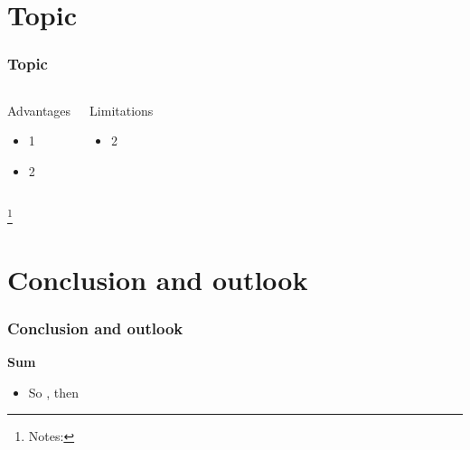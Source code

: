 \documentclass[hyperref={bookmarks=false},aspectratio=169]{beamer}
\newcommand{\cmark}{\textcolor{blue}{\ding{51}}}%
\newcommand{\xmark}{\textcolor{red}{\ding{55}}}%
\newcommand\blfootnote[1]{%
  \begingroup
  \renewcommand\thefootnote{}%
  \footnote{#1}%
  \endgroup
}
\begin{document}
\section{Topic}
\begin{frame}
  \frametitle{Topic}
  \begin{columns}[t]       %
        \begin{center}
          \begin{minipage}{1\textwidth} %
            \begin{block}{Advantages}
            \begin{itemize}
              \item 1
              \item 2
            \end{itemize}
          \end{block}
          \end{minipage}
        \end{center}
        \begin{center}
          \begin{minipage}{1\textwidth} %
            \begin{alertblock}{Limitations}
            \begin{itemize}
              \item 2
            \end{itemize}
          \end{alertblock}
          \end{minipage}
        \end{center}
  \end{columns}  
  \blfootnote{\tiny Notes:}  
\end{frame}
\section{Conclusion and outlook}
\begin{frame}  
\frametitle{Conclusion and outlook}
\textbf{Sum}
\begin{itemize}
  \item So \cmark, then \xmark
\end{itemize}
\end{frame}
\end{document}
